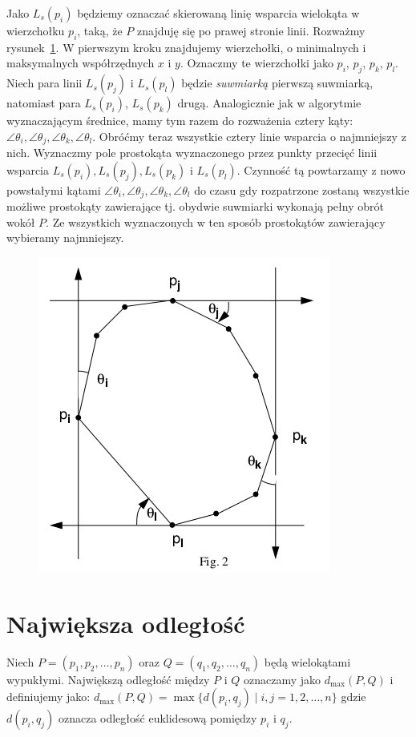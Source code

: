 Jako $L_s(p_i)$ będziemy oznaczać skierowaną linię wsparcia wielokąta
w wierzchołku $p_i$, taką, że $P$ znajduję się po prawej stronie
linii. Rozważmy rysunek~\ref{img:calipers2}. W pierwszym kroku znajdujemy wierzchołki,
o minimalnych i maksymalnych współrzędnych $x$ i $y$. Oznaczmy te
wierzchołki jako $p_i$, $p_j$, $p_k$, $p_l$. Niech para linii
$L_s(p_j)$ i $L_s(p_l)$ będzie \emph{suwmiarką} pierwszą suwmiarką,
natomiast para $L_s(p_i)$, $L_s(p_k)$ drugą. Analogicznie jak w
algorytmie wyznaczającym średnice, mamy tym razem do rozważenia cztery
kąty: $\angle{\theta_i}, \angle{\theta_j}, \angle{\theta_k},
\angle{\theta_l}$. Obróćmy teraz wszystkie cztery linie wsparcia o
najmniejszy z nich. Wyznaczmy pole prostokąta wyznaczonego przez
punkty przecięć linii wsparcia $L_s(p_i), L_s(p_j), L_s(p_k)$ i
$L_s(p_l)$. Czynność tą powtarzamy z nowo powstałymi kątami
$\angle{\theta_i}, \angle{\theta_j}, \angle{\theta_k},
\angle{\theta_l}$ do czasu gdy rozpatrzone zostaną wszystkie możliwe
prostokąty zawierające tj. obydwie suwmiarki wykonają pełny obrót
wokół $P$. Ze wszystkich wyznaczonych w ten sposób prostokątów
zawierający wybieramy najmniejszy.

\begin{figure}[htb]
  \centering
  \includegraphics[scale=0.5]{img/calipers2}
  \caption{\label{img:calipers2}}
\end{figure}

\section{Największa odległość\label{sec:max_dist}}
\begin{problem}
  Niech $P = (p_1, p_2, \ldots, p_n)$ oraz $Q = (q_1, q_2, \ldots,
  q_n)$ będą wielokątami wypukłymi. Największą odległość między $P$ i
  $Q$ oznaczamy jako $d_{\max}(P, Q)$ i definiujemy jako: $d_{\max}(P,
  Q) = \max{\{ d(p_i, q_j) \mid i, j = 1, 2, \ldots, n \}}$ gdzie
  $d(p_i, q_j)$ oznacza odległość euklidesową pomiędzy $p_i$ i $q_j$.
\end{problem}

